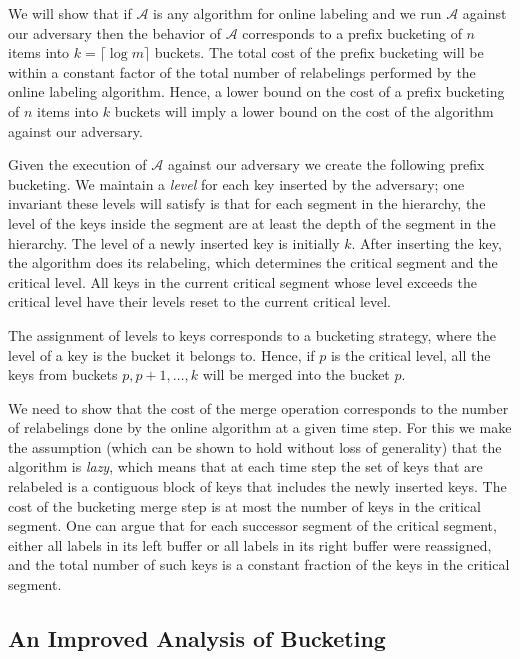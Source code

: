 \documentclass[runningheads,a4paper]{llncs}
\newcommand{\A}{\mathcal{A}}
\begin{document}
We will show that if $\A$ is any algorithm for online labeling and we run $\A$ against our adversary then
the behavior of $\A$ corresponds to a prefix bucketing of $n$ items into $k=\lceil \log m \rceil$ buckets.
The total cost of the prefix bucketing will be within a constant factor of  the total number of relabelings
performed by the online labeling algorithm. Hence, a lower bound on the cost of a prefix bucketing of $n$ items into $k$ 
buckets will imply a lower bound on the cost of the algorithm against our adversary. 

Given the execution of $\A$ against our adversary we create 
the following prefix bucketing.  We maintain a \emph{level} for each key inserted by the adversary; one invariant
these levels will satisfy is that for each segment in the hierarchy, the level of the keys inside
the segment are at least the depth of the segment in the hierarchy.
The level of a newly inserted key is initially $k$. After inserting the key, the algorithm
does its relabeling, which determines the critical segment and the critical level.
All keys in the current critical segment whose level exceeds the critical level have their levels
reset to the current critical level.   

The assignment of levels to keys corresponds to a bucketing strategy, where the level of a key is the bucket
it belongs to.   Hence, if $p$ is the critical level, all the keys from 
buckets $p,p+1,\dots,k$ will be merged into the bucket $p$. 

We need to show that 
the cost of the merge operation corresponds to the number of relabelings done by the online algorithm
at a given time step.  For this we  make the assumption (which can be shown to hold without loss of generality) that the algorithm is \emph{lazy}, which means
that at each time step the set of keys that are relabeled is a contiguous block of keys that includes
the newly inserted keys.    The cost of the bucketing merge step is at most the number of keys in
the critical segment.  One can argue that for each successor segment of the critical segment, either all labels in its left buffer
or all labels in its right buffer were reassigned, and the total number of such keys is a constant fraction of the keys
in the critical segment. 


\subsection{An Improved Analysis of Bucketing}
\end{document}
